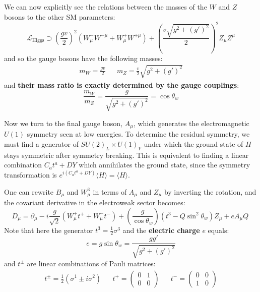 \documentclass[11pt, oneside]{article}   	%
\theoremstyle{definition}
\numberwithin{equation}{subsection}		%
\begin{document}
We can now explicitly see the relations between the masses of the $W$ and $Z$ bosons to the other SM parameters:
\begin{equation}
	\mathcal{L}_\mathrm{Higgs}\supset \left(\frac{gv}{2}\right)^2 \left(W_\mu^- W^{-\mu} + W_\mu^+ W^{+\mu}\right) + \left(\frac{v\sqrt{g^2 
	+ (g')^2}}{2}\right)^2 Z_\mu Z^\mu
\end{equation}
and so the gauge bosons have the following masses:
\begin{align}
	m_W = \frac{gv}{2} && m_Z = \frac{v}{2}\sqrt{g^2 + (g')^2}
\end{align}
and \textbf{their mass ratio is exactly determined by the gauge couplings}:
\begin{equation}
	\frac{m_W}{m_Z} = \frac{g}{\sqrt{g^2 + (g')^2}} = \cos\theta_w
\end{equation}

Now we turn to the final gauge boson, $A_\mu$, which generates the electromagnetic $U(1)$ symmetry seen at low energies. 
To determine the residual symmetry, we must find a generator of $SU(2)_L\times U(1)_Y$ under which the ground state 
of $H$ stays symmetric after symmetry breaking. This is equivalent to finding a linear combination $C_a t^a + D Y$ which annihilates the ground state, since the symmetry transformation is $e^{i(C_a t^a + DY)}\langle H \rangle = \langle H \rangle$. 

One can rewrite $B_\mu$ and $W_\mu^3$ in terms of $A_\mu$ and $Z_\mu$ by inverting the rotation, and the covariant 
derivative in the electroweak sector becomes:
\begin{equation}
	D_\mu = \partial_\mu -i \frac{g}{\sqrt 2} (W_\mu^+ t^+ + W_\mu^- t^-) + \left(\frac{g}{\cos\theta_w}\right) (t^3 - 
	Q\sin^2\theta_w) Z_\mu + e A_\mu Q~
	\label{eq:ew_cov}
\end{equation}
Note that here the generator $t^3 = \frac{1}{2}\sigma^3$ and the \textbf{electric charge} $e$ equals:
\begin{equation}
	e = g\sin\theta_w = \frac{gg'}{\sqrt{g^2 + (g')^2}}
\end{equation}
and $t^\pm$ are linear combinations of Pauli matrices:
\begin{align}
	t^\pm = \frac{1}{2}(\sigma^1 \pm i \sigma^2) && t^+ = \begin{pmatrix} 0 & 1 \\ 0 & 0 \end{pmatrix} &&
	t^- = \begin{pmatrix} 0 & 0 \\ 1 & 0 \end{pmatrix} 
\end{align}
\end{document}

